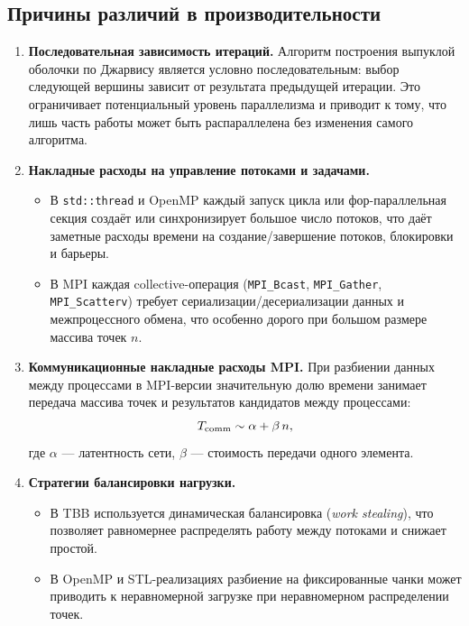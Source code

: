 \documentclass[12pt,a4paper]{article}
\begin{document}
\subsection*{Причины различий в производительности}
\begin{enumerate}
  \item \textbf{Последовательная зависимость итераций.}  
    Алгоритм построения выпуклой оболочки по Джарвису является условно последовательным: выбор следующей вершины зависит от результата предыдущей итерации. Это ограничивает потенциальный уровень параллелизма и приводит к тому, что лишь часть работы может быть распараллелена без изменения самого алгоритма.
  
  \item \textbf{Накладные расходы на управление потоками и задачами.}  
    \begin{itemize}
      \item В \texttt{std::thread} и OpenMP каждый запуск цикла или фор-параллельная секция создаёт или синхронизирует большое число потоков, что даёт заметные расходы времени на создание/завершение потоков, блокировки и барьеры.  
      \item В MPI каждая collective-операция (\texttt{MPI\_Bcast}, \texttt{MPI\_Gather}, \texttt{MPI\_Scatterv}) требует сериализации/десериализации данных и межпроцессного обмена, что особенно дорого при большом размере массива точек \(n\).
    \end{itemize}

  \item \textbf{Коммуникационные накладные расходы MPI.}  
    При разбиении данных между процессами в MPI-версии значительную долю времени занимает передача массива точек и результатов кандидатов между процессами:
    \[
      T_{\rm comm} \sim \alpha + \beta \, n,
    \]
    где \(\alpha\) — латентность сети, \(\beta\) — стоимость передачи одного элемента. 

  \item \textbf{Стратегии балансировки нагрузки.}  
    \begin{itemize}
      \item В TBB используется динамическая балансировка (\emph{work stealing}), что позволяет равномернее распределять работу между потоками и снижает простой.  
      \item В OpenMP и STL-реализациях разбиение на фиксированные чанки может приводить к неравномерной загрузке при неравномерном распределении точек.
    \end{itemize}


\end{enumerate}
\end{document}
